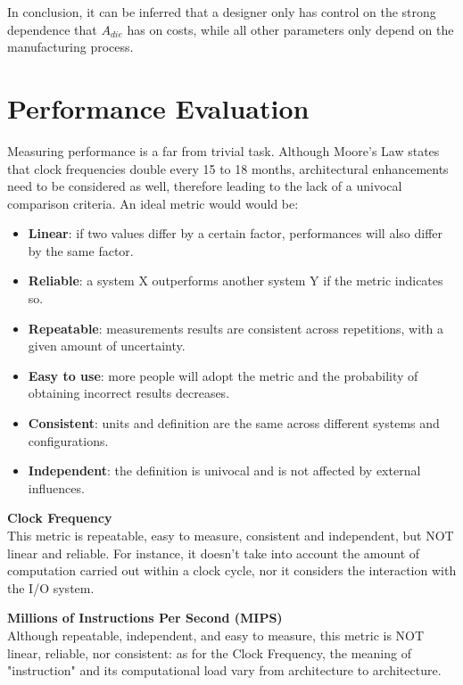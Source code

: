 In conclusion, it can be inferred that a designer only has control on the strong dependence that $A_{die}$ has on costs, while all other parameters only depend on the manufacturing process.


\section{Performance Evaluation}
Measuring performance is a far from trivial task. Although Moore's Law states that clock frequencies double every 15 to 18 months, architectural enhancements need to be considered as well, therefore leading to the lack of a univocal comparison criteria. An ideal metric would would be:
\begin{itemize}
    \item \textbf{Linear}: if two values differ by a certain factor, performances will also differ by the same factor.
    \item \textbf{Reliable}: a system X outperforms another system Y if the metric indicates so.
    \item \textbf{Repeatable}: measurements results are consistent across repetitions, with a given amount of uncertainty.
    \item \textbf{Easy to use}: more people will adopt the metric and the probability of obtaining incorrect results decreases.
    \item \textbf{Consistent}: units and definition are the same across different systems and configurations.
    \item \textbf{Independent}: the definition is univocal and is not affected by external influences.
\end{itemize}

\begin{example}
\textbf{Clock Frequency} \\
This metric is repeatable, easy to measure, consistent and independent, but NOT linear and reliable. For instance, it doesn't take into account the amount of computation carried out within a clock cycle, nor it considers the interaction with the I/O system.
\end{example}

\begin{example}
\textbf{Millions of Instructions Per Second (MIPS)} \\
Although repeatable, independent, and easy to measure, this metric is NOT linear, reliable, nor consistent: as for the Clock Frequency, the meaning of "instruction" and its computational load vary from architecture to architecture.
\end{example}

